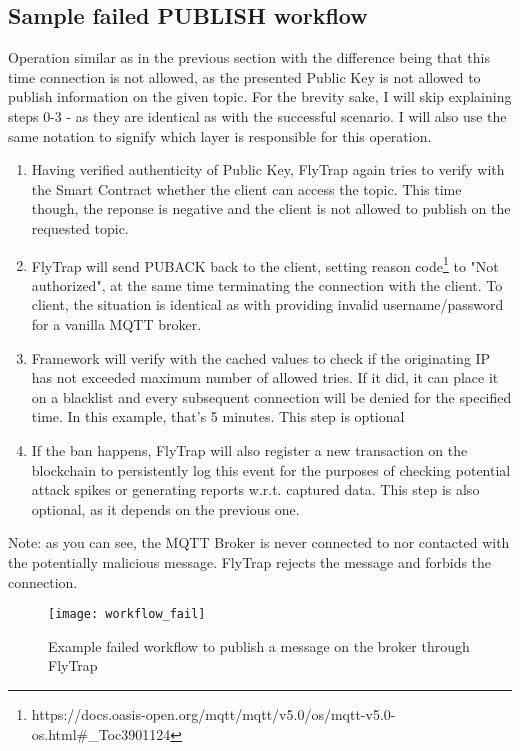 \subsection{Sample failed PUBLISH workflow}
Operation similar as in the previous section with the difference being that this time connection is not allowed, as the presented Public Key is not allowed to publish information on the given topic. For the brevity sake, I will skip explaining steps 0-3 - as they are identical as with the successful scenario. I will also use the same notation to signify which layer is responsible for this operation.

\begin{enumerate}\addtocounter{enumi}{4}
    \item Having verified authenticity of Public Key, FlyTrap again tries to verify with the Smart Contract whether the client can access the topic. This time though, the reponse is negative and the client is not allowed to publish on the requested topic.
    \item FlyTrap will send PUBACK back to the client, setting reason code\footnote{https://docs.oasis-open.org/mqtt/mqtt/v5.0/os/mqtt-v5.0-os.html\#\_Toc3901124} to "Not authorized", at the same time terminating the connection with the client. To client, the situation is identical as with providing invalid username/password for a vanilla MQTT broker.
    \item Framework will verify with the cached values to check if the originating IP has not exceeded maximum number of allowed tries. If it did, it can place it on a blacklist and every subsequent connection will be denied for the specified time. In this example, that's 5 minutes. This step is optional
    \item If the ban happens, FlyTrap will also register a new transaction on the blockchain to persistently log this event for the purposes of checking potential attack spikes or generating reports w.r.t.  captured data. This step is also optional, as it depends on the previous one.
\end{enumerate}

Note: as you can see, the MQTT Broker is never connected to nor contacted with the potentially malicious message. FlyTrap rejects the message and forbids the connection. 
\begin{figure}[h]
    \centering
    \texttt{[image: workflow\_fail]}
    \caption{Example failed workflow to publish a message on the broker through FlyTrap}
    \label{fig:workflow_fail}
\end{figure}

